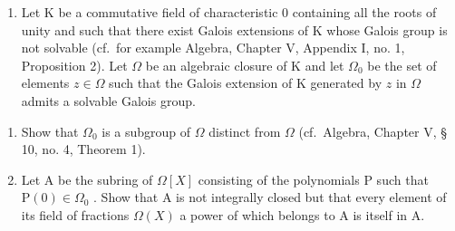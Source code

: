 \begin{enumerate}
\def\labelenumi{\arabic{enumi}.}
\setcounter{enumi}{14}
\tightlist
\item
  Let K be a commutative field of characteristic 0 containing all the roots of unity and such that there exist Galois extensions of K whose Galois group is not solvable (cf.~for example Algebra, Chapter V, Appendix I, no. 1, Proposition 2). Let \(\Omega\) be an algebraic closure of K and let \(\Omega_0\) be the set of elements \(z \in \Omega\) such that the Galois extension of K generated by \(z\) in \(\Omega\) admits a solvable Galois group.
\end{enumerate}

\begin{enumerate}
\def\labelenumi{(\alph{enumi})}
\item
  Show that \(\Omega_0\) is a subgroup of \(\Omega\) distinct from \(\Omega\) (cf.~Algebra, Chapter V, § 10, no. 4, Theorem 1).
\item
  Let A be the subring of \(\Omega[X]\) consisting of the polynomials P such that \(\mathrm{P}(0) \in \Omega_{0}\) . Show that A is not integrally closed but that every element of its field of fractions \(\Omega(X)\) a power of which belongs to A is itself in A.
\end{enumerate}

